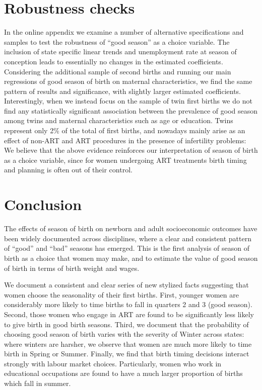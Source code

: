 \documentclass[a4paper, 11.5 pt]{article}
\theoremstyle{plain}
\begin{document}
\begin{doublespace}
\section{Robustness checks}
In the online appendix we examine a number of alternative specifications and samples to test the robustness of ``good season'' as a choice variable.  The inclusion of state specific linear trends and unemployment rate at season of conception leads to essentially no changes in the estimated coefficients. Considering the additional sample of second births and running our main regressions of good season of birth on maternal characteristics, we find the same pattern of results and significance, with slightly larger estimated coefficients. Interestingly, when we instead focus on the sample of twin first births we do not find any statistically significant association between the prevalence of good season among twins and maternal characteristics such as age or education. Twins represent only 2\% of the total of first births, and nowadays mainly arise as an effect of non-ART and ART procedures in the presence of infertility problems: We believe that the above evidence reinforces our interpretation of season of birth as a choice variable, since for women undergoing ART treatments birth timing and planning is often out of their control.




\newpage

\section{Conclusion}
The effects of season of birth on newborn and adult socioeconomic outcomes have been widely documented across disciplines, where a clear and consistent pattern of ``good'' and ``bad'' seasons has emerged. This is the first analysis of season of birth as a choice that women may make, and to estimate the value of good season of birth in terms of birth weight and wages.

We document a consistent and clear series of new stylized facts suggesting that women choose the seasonality of their first births.  First, younger women are considerably more likely to time births to fall in quarters 2 and 3 (good season). Second, those women who engage in ART are found to be significantly less likely to give birth in good birth seasons. Third, we document that the probability of choosing good season of birth varies with the severity of Winter across states: where winters are harsher, we observe that women are much more likely to time birth in Spring or Summer. Finally, we find that birth timing decisions interact strongly with labour market choices.  Particularly, women who work in educational occupations are found to have a much larger proportion of births which fall in summer.


\end{doublespace}
\end{document}
